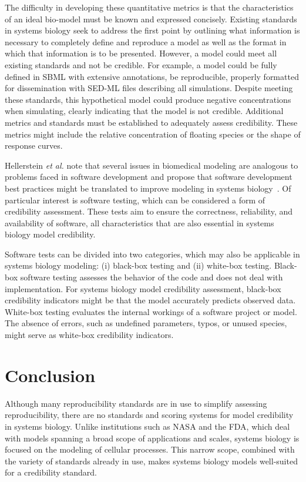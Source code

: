 \documentclass[12pt]{report}
\begin{document}
The difficulty in developing these quantitative metrics is that the characteristics of an ideal bio-model must be known and expressed concisely. Existing standards in systems biology seek to address the first point by outlining what information is necessary to completely define and reproduce a model as well as the format in which that information is to be presented. However, a model could meet all existing standards and not be credible. For example, a model could be fully defined in SBML with extensive annotations, be reproducible, properly formatted for dissemination with SED-ML files describing all simulations. Despite meeting these standards, this hypothetical model could produce negative concentrations when simulating, clearly indicating that the model is not credible.  Additional metrics and standards must be established to adequately assess credibility. These metrics might include the relative concentration of floating species or the shape of response curves.

Hellerstein \textit{et al.} note that several issues in biomedical modeling are analogous to problems faced in software development and propose that software development best practices might be translated to improve modeling in systems biology~\cite{Hellerstein2019}. Of particular interest is software testing, which can be considered a form of credibility assessment. These tests aim to ensure the correctness, reliability, and availability of software, all characteristics that are also essential in systems biology model credibility. 


Software tests can be divided into two categories, which may also be applicable in systems biology modeling: (i) black-box testing and (ii) white-box testing. Black-box software testing assesses the behavior of the code and does not deal with implementation. For systems biology model credibility assessment, black-box credibility indicators might be that the model accurately predicts observed data. White-box testing evaluates the internal workings of a software project or model. The absence of errors, such as undefined parameters, typos, or unused species, might serve as white-box credibility indicators.  



\section{Conclusion}

Although many reproducibility standards are in use to simplify assessing reproducibility, there are no standards and scoring systems for model credibility in systems biology. Unlike institutions such as NASA and the FDA, which deal with models spanning a broad scope of applications and scales, systems biology is focused on the modeling of cellular processes. This narrow scope, combined with the variety of standards already in use, makes systems biology models well-suited for a credibility standard.
\end{document}
